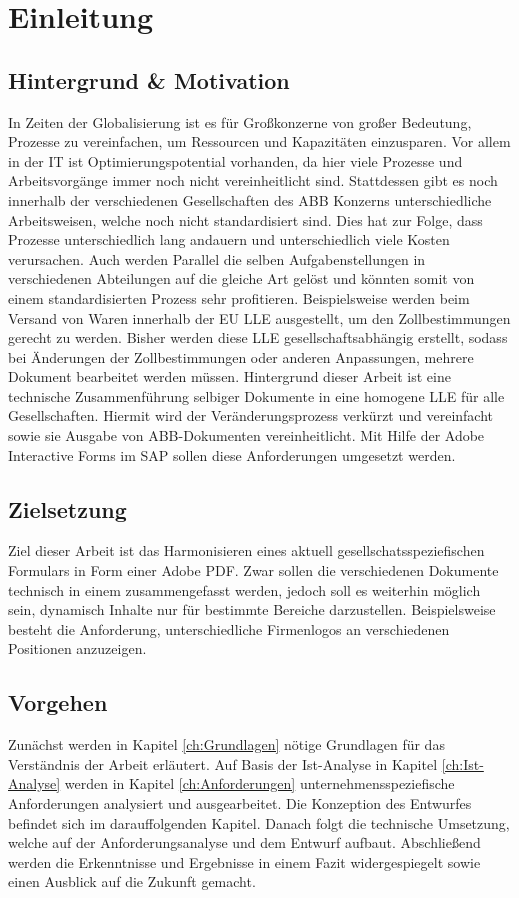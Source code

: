 \chapter{Einleitung}

\section{Hintergrund \& Motivation}

In Zeiten der Globalisierung ist es für Großkonzerne von großer Bedeutung, Prozesse zu vereinfachen, um Ressourcen und Kapazitäten einzusparen. Vor allem in der \ac{IT} ist Optimierungspotential vorhanden, da hier viele Prozesse und Arbeitsvorgänge immer noch nicht vereinheitlicht sind. Stattdessen gibt es noch innerhalb der verschiedenen Gesellschaften des ABB Konzerns unterschiedliche Arbeitsweisen, welche noch nicht standardisiert sind. Dies hat zur Folge, dass Prozesse unterschiedlich lang andauern und unterschiedlich viele Kosten verursachen. Auch werden Parallel die selben Aufgabenstellungen in verschiedenen Abteilungen auf die gleiche Art gelöst und könnten somit von einem standardisierten Prozess sehr profitieren. Beispielsweise werden beim Versand von Waren innerhalb der \ac{EU} \ac{LLE} ausgestellt, um den Zollbestimmungen gerecht zu werden. Bisher werden diese \ac{LLE} gesellschaftsabhängig erstellt, sodass bei Änderungen der Zollbestimmungen oder anderen Anpassungen, mehrere Dokument bearbeitet werden müssen. Hintergrund dieser Arbeit ist eine technische Zusammenführung selbiger Dokumente in eine homogene \ac{LLE} für alle Gesellschaften. Hiermit wird der Veränderungsprozess verkürzt und vereinfacht sowie sie Ausgabe von ABB-Dokumenten vereinheitlicht. Mit Hilfe der Adobe Interactive Forms im SAP sollen diese Anforderungen umgesetzt werden.

\section{Zielsetzung}

Ziel dieser Arbeit ist das Harmonisieren eines aktuell gesellschatsspeziefischen Formulars in Form einer Adobe PDF. Zwar sollen die verschiedenen Dokumente technisch in einem zusammengefasst werden, jedoch soll es weiterhin möglich sein, dynamisch Inhalte nur für bestimmte Bereiche darzustellen. Beispielsweise besteht die Anforderung, unterschiedliche Firmenlogos an verschiedenen Positionen anzuzeigen.

\section{Vorgehen}


Zunächst werden in Kapitel \ref{ch:Grundlagen} nötige Grundlagen für das Verständnis der Arbeit erläutert. Auf Basis der Ist-Analyse in Kapitel \ref{ch:Ist-Analyse} werden in Kapitel \ref{ch:Anforderungen} unternehmensspeziefische Anforderungen analysiert und ausgearbeitet. Die Konzeption des Entwurfes befindet sich im darauffolgenden Kapitel. Danach folgt die technische Umsetzung, welche auf der Anforderungsanalyse und dem Entwurf aufbaut. Abschließend werden die Erkenntnisse und Ergebnisse in einem Fazit widergespiegelt sowie einen Ausblick auf die Zukunft gemacht.